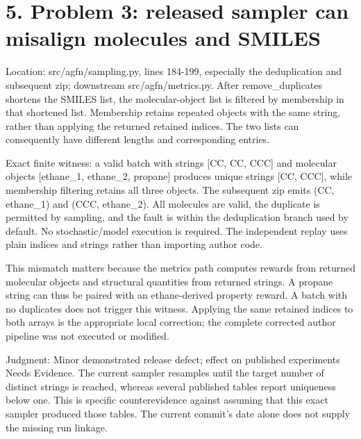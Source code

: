 \documentclass[10pt]{article}
\begin{document}
\section*{5. Problem 3: released sampler can misalign molecules and SMILES}
Location: src/agfn/sampling.py, lines 184-199, especially the deduplication and subsequent zip; downstream src/agfn/metrics.py. After remove\_duplicates shortens the SMILES list, the molecular-object list is filtered by membership in that shortened list. Membership retains repeated objects with the same string, rather than applying the returned retained indices. The two lists can consequently have different lengths and corresponding entries.\par
Exact finite witness: a valid batch with strings [CC, CC, CCC] and molecular objects [ethane\_1, ethane\_2, propane] produces unique strings [CC, CCC], while membership filtering retains all three objects. The subsequent zip emits (CC, ethane\_1) and (CCC, ethane\_2). All molecules are valid, the duplicate is permitted by sampling, and the fault is within the deduplication branch used by default. No stochastic/model execution is required. The independent replay uses plain indices and strings rather than importing author code.\par
This mismatch matters because the metrics path computes rewards from returned molecular objects and structural quantities from returned strings. A propane string can thus be paired with an ethane-derived property reward. A batch with no duplicates does not trigger this witness. Applying the same retained indices to both arrays is the appropriate local correction; the complete corrected author pipeline was not executed or modified.\par
Judgment: Minor demonstrated release defect; effect on published experiments Needs Evidence. The current sampler resamples until the target number of distinct strings is reached, whereas several published tables report uniqueness below one. This is specific counterevidence against assuming that this exact sampler produced those tables. The current commit’s date alone does not supply the missing run linkage.\par
\end{document}

